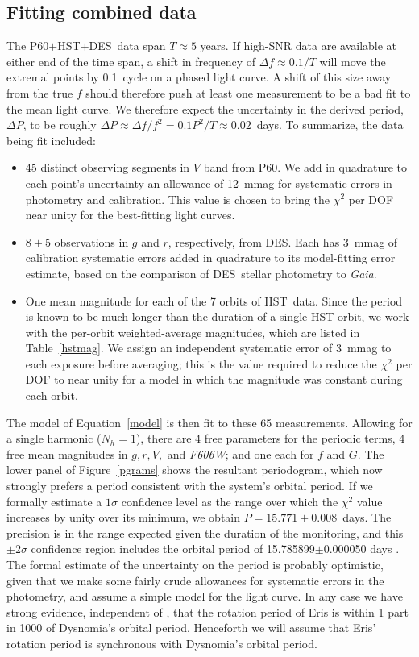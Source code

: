 \documentclass[onecolumn]{aastex631}
\newcommand{\des}{DES}
\newcommand{\hst}{HST}
\newcommand{\gaia}{\textit{Gaia}}
\begin{document}
\subsection{Fitting combined data}
\label{fitsec}
The P60$+$\hst$+$\des\ data span $T\approx5$ years. If high-SNR data are available at either end of the time span, a shift in frequency of $\Delta f\approx 0.1/T$ will move the extremal points by 0.1~cycle on a phased light curve.  A shift of this size away from the true $f$ should therefore push at least one measurement to be a bad fit to the mean light curve.  We therefore expect the uncertainty in the derived period, $\Delta P$, to be roughly $\Delta P \approx \Delta f / f^2  = 0.1P^2/T\approx 0.02$~days.  To summarize, the data being fit included:
\begin{itemize}
\item 45 distinct observing segments in $V$ band from P60. We add in quadrature to each point's uncertainty an allowance of 12~mmag for systematic errors in photometry and calibration. This value is chosen to bring the $\chi^2$ per DOF near unity for the best-fitting light curves.
\item $8+5$ observations in $g$ and $r$, respectively, from \des. Each has 3~mmag of calibration systematic errors added in quadrature to its model-fitting error estimate, based on the comparison of \des\ stellar photometry to \gaia.
\item One mean magnitude for each of the 7 orbits of \hst\ data. Since the period is known to be much longer than the duration of a single HST orbit, we work with the per-orbit weighted-average magnitudes, which are listed in Table~\ref{hstmag}. We assign an independent systematic error of 3~mmag to each exposure before averaging; this is the value required to reduce the $\chi^2$ per DOF to near unity for a model in which the magnitude was constant during each orbit.
\end{itemize}

The model of Equation~\ref{model} is then fit to these 65 measurements.  Allowing for a single harmonic ($N_h=1$), there are 4 free parameters for the periodic terms, 4 free mean magnitudes in $g,r,V,$ and {\it F606W}; and one each for $f$ and $G.$ The lower panel of Figure~\ref{pgrams} shows the resultant periodogram, which now strongly prefers a period consistent with the system's orbital period.
If we formally estimate a $1\sigma$ confidence level as the range over which the $\chi^2$ value increases by unity over its minimum, we obtain $P=15.771\pm0.008$~days. The precision is in the range expected given the duration of the monitoring, and this $\pm2\sigma$ confidence region includes the orbital period of 15.785899$\pm$0.000050 days \citep{H21}.  The formal estimate of the uncertainty on the period is probably optimistic, given that we make some fairly crude allowances for systematic errors in the photometry, and assume a simple model for the light curve.  In any case we have strong evidence, independent of \citet{szakats}, that the rotation period of Eris is within 1 part in 1000 of Dysnomia's orbital period. Henceforth we will assume that Eris' rotation period is synchronous with Dysnomia's orbital period.
\end{document}
